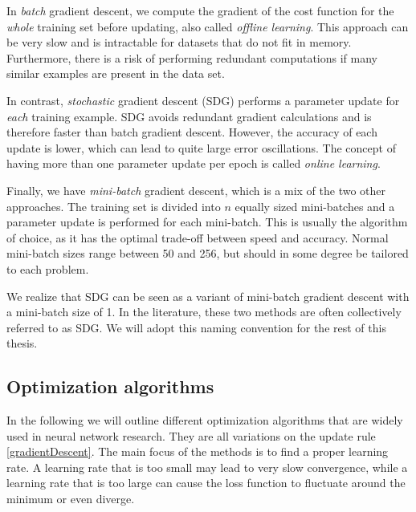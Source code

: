 \documentclass[twoside,english]{uiofysmaster}
\begin{document}
In \textit{batch} gradient descent, 
we compute the gradient of the cost function for the \textit{whole} training set before updating, also called 
\textit{offline learning}. 
This approach can be very slow and is intractable for datasets that do not fit in memory. Furthermore, there is a risk
of performing redundant computations if many similar examples are present in the data set.

In contrast, \textit{stochastic} gradient descent (SDG) performs a parameter update for \textit{each} training example. 
SDG avoids redundant gradient calculations and is therefore faster than batch gradient descent. However, the accuracy 
of each update is lower, which can lead to quite large error oscillations. The concept of having  
more than one parameter update per epoch is called \textit{online learning}. 

Finally, we have \textit{mini-batch} gradient descent, which is a mix of the two other approaches. The training set 
is divided into $n$ equally sized mini-batches and a parameter update is performed for each mini-batch. This is usually the
algorithm of choice, as it has the optimal trade-off between speed and accuracy. Normal mini-batch sizes range
between 50 and 256, but should in some degree be tailored to each problem. 

We realize that SDG can be seen as 
a variant of mini-batch gradient descent with a mini-batch size of 1. In the literature, these two methods 
are often collectively referred to as SDG. We will adopt this naming convention for the rest of this thesis. 


\subsection{Optimization algorithms} \label{sec:optimizationAlgorithms}
In the following we will outline different optimization algorithms that are widely used in neural network research. 
They are all variations on the update rule \eqref{gradientDescent}. The main focus of the methods is to find
a proper learning rate. A learning rate that is too small may lead to very slow convergence, while 
a learning rate that is too large can cause the loss function to fluctuate around the minimum or even diverge. 
\end{document}
